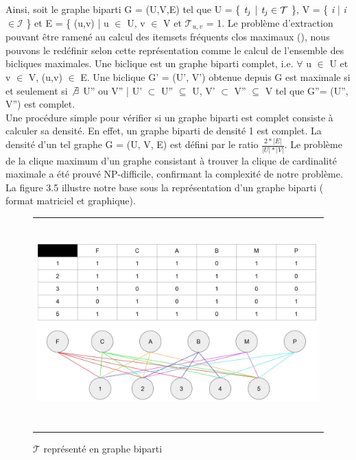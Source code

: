 \documentclass[a4paper,10pt]{report}
\begin{document}
	Ainsi, soit le graphe biparti G = (U,V,E) tel que U = \{ $\emph{t}_{j}$ | $\emph{t}_{j} \in \mathcal{T}$ \}, V = \{ \emph{i} | \emph{i} $\in \mathcal{I}$ \} et E = \{ (u,v) | u $\in$ U, v $\in$ V et $\mathcal{T}_{u,v}$ = 1. Le problème d'extraction pouvant être ramené au calcul des itemsets fréquents clos maximaux (\cite{ZAK00}), nous pouvons le redéfinir selon cette représentation comme le calcul de l'ensemble des bicliques maximales. Une biclique est un graphe biparti complet, i.e. $\forall$ u $\in$ U et v $\in$ V, (u,v) $\in$ E. Une biclique G' = (U', V') obtenue depuis G est maximale si et seulement si $\not\exists$ U'' ou V'' | U' $\subset$ U'' $\subseteq$ U, V' $\subset$ V'' $\subseteq$ V tel que G''= (U'', V'') est complet.\\
	
	Une procédure simple pour vérifier si un graphe biparti est complet consiste à calculer sa densité. En effet, un graphe biparti de densité 1 est complet. La densité d'un tel graphe G = (U, V, E) est défini par le ratio $\frac{2*|E|}{|U|*|V|}$. Le problème de la clique maximum d'un graphe consistant à trouver la clique de cardinalité maximale a été prouvé NP-difficile, confirmant la complexité de notre problème. La figure 3.5 illustre notre base sous la représentation d'un graphe biparti ( format matriciel et graphique). \\
	
\begin{figure}
	\begin{adjustwidth}{-1cm}{}
	\begin{tabular}{l}
	\includegraphics[width=15cm,height=8cm]{./img/graphe_biparti}\\
	\end{tabular}
	\caption{\label{fig:text}$\mathcal{T}$ représenté en graphe biparti}
	\end{adjustwidth}
\end{figure}





\end{document}
